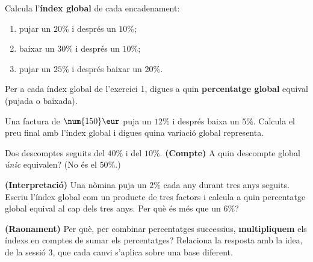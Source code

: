 \begin{exercicis}
\begin{exlist}
  \item Calcula l'\textbf{índex global} de cada encadenament:
    \begin{enumerate}[label=\alph*), leftmargin=1.6em, topsep=2pt]
      \item pujar un $20\%$ i després un $10\%$;
      \item baixar un $30\%$ i després un $10\%$;
      \item pujar un $25\%$ i després baixar un $20\%$.
    \end{enumerate}
  \item Per a cada índex global de l'exercici 1, digues a quin \textbf{percentatge
        global} equival (pujada o baixada).
  \item Una factura de $\num{150}\eur$ puja un $12\%$ i després baixa un $5\%$. Calcula
        el preu final amb l'índex global i digues quina variació global representa.
  \item Dos descomptes seguits del $40\%$ i del $10\%$. \textbf{(Compte)} A quin
        descompte global \emph{únic} equivalen? (No és el $50\%$.)
  \item \textbf{(Interpretació)} Una nòmina puja un $2\%$ cada any durant tres anys
        seguits. Escriu l'índex global com un producte de tres factors i calcula a quin
        percentatge global equival al cap dels tres anys. Per què és més que un $6\%$?
  \item \textbf{(Raonament)} Per què, per combinar percentatges successius,
        \textbf{multipliquem} els índexs en comptes de sumar els percentatges? Relaciona
        la resposta amb la idea, de la sessió 3, que cada canvi s'aplica sobre una base
        diferent.
\end{exlist}
\end{exercicis}

